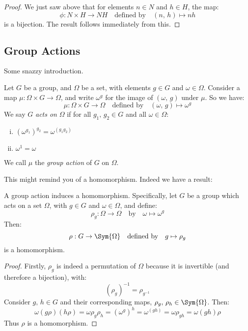 \begin{proof}
    We just saw above that for elements \(n \in N\) and \(h \in H\), the map:
    \[\phi:N \times H \to NH \quad \text{defined by} \quad (n,\,h) \mapsto nh\]
    is a bijection.
    The result follows immediately from this.
\end{proof}

\subsection{Group Actions}
Some snazzy introduction.

\begin{definition}
    Let \(G\) be a group, and \(\Omega\) be a set, with elements \(g \in G\) and \(\omega \in \Omega\).
    Consider a map \(\mu:\Omega \times G \to \Omega\), and write \(\omega^g\) for the image of \((\omega,\,g)\) under
    \(\mu\).
    So we have:
    \[\mu:\Omega \times G \to \Omega \quad \text{defined by} \quad (\omega,\,g) \mapsto \omega^g\]
    We say \(G\) \emph{acts on} \(\Omega\) if for all \(g_1,\,g_2 \in G\) and all \(\omega \in \Omega\):
    \begin{enumerate}[(i)]
        \item \({(\omega^{g_1})}^{g_2} = \omega^{(g_1 g_2)}\)
        \item \(\omega^1 = \omega\)
    \end{enumerate}
    We call \(\mu\) the \emph{group action} of \(G\) on \(\Omega\).
\end{definition}

This might remind you of a homomorphism.
Indeed we have a result:

\begin{lemma}\label{lem:actionhom}
    A group action induces a homomorphism.
    Specifically, let \(G\) be a group which acts on a set \(\Omega\), with \(g \in G\) and \(\omega \in \Omega\), and
    define:
    \[\rho_g:\Omega \to \Omega \quad \text{by} \quad \omega \mapsto \omega^g\]
    Then:
    \[\rho:G \to \Sym{\Omega} \quad \text{defined by} \quad g \mapsto \rho_g\]
    is a homomorphism.
\end{lemma}

\begin{proof}
    Firstly, \(\rho_g\) is indeed a permutation of \(\Omega\) because it is invertible (and therefore a bijection),
    with:
    \[{(\rho_g)}^{-1} = \rho_{g^{-1}}\]
    Consider \(g,\,h \in G\) and their corresponding maps, \(\rho_{g},\,\rho_{h} \in \Sym{\Omega}\).
    Then:
    \[\omega(g\rho)(h\rho) = \omega\rho_g\rho_h = {(\omega^g)}^h = \omega^{(gh)} = \omega\rho_{gh} = \omega(gh)\rho\]
    Thus \(\rho\) is a homomorphism.
\end{proof}

